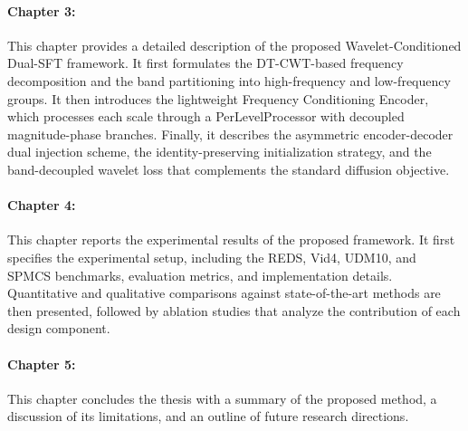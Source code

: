 \paragraph*{Chapter 3:} This chapter provides a detailed description of the proposed Wavelet-Conditioned Dual-SFT framework. It first formulates the DT-CWT-based frequency decomposition and the band partitioning into high-frequency and low-frequency groups. It then introduces the lightweight Frequency Conditioning Encoder, which processes each scale through a PerLevelProcessor with decoupled magnitude-phase branches. Finally, it describes the asymmetric encoder-decoder dual injection scheme, the identity-preserving initialization strategy, and the band-decoupled wavelet loss that complements the standard diffusion objective.

\paragraph*{Chapter 4:} This chapter reports the experimental results of the proposed framework. It first specifies the experimental setup, including the REDS, Vid4, UDM10, and SPMCS benchmarks, evaluation metrics, and implementation details. Quantitative and qualitative comparisons against state-of-the-art methods are then presented, followed by ablation studies that analyze the contribution of each design component.

\paragraph*{Chapter 5:} This chapter concludes the thesis with a summary of the proposed method, a discussion of its limitations, and an outline of future research directions.